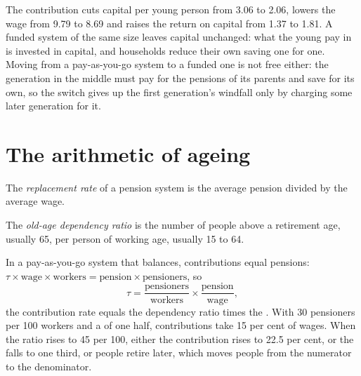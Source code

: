 \label{out:b2:overlapping-generations:olg}

The contribution cuts capital per young person from 3.06 to 2.06, lowers the wage from 9.79 to 8.69 and raises the return on capital from 1.37 to 1.81. A funded system of the same size leaves
capital unchanged: what the young pay in is invested in capital, and households reduce their own saving one for one.
Moving from a pay-as-you-go system to a funded one is not free either: the generation in the middle must pay for the
pensions of its parents and save for its own, so the switch gives up the first generation's windfall only by charging
some later generation for it.

\section{The arithmetic of ageing}\label{sec:b2:overlapping-generations:ageing}

\begin{definition}\label{def:b2:overlapping-generations:replacement-rate}
The \emph{replacement rate} of a pension system is the average pension divided by the average
wage.
\end{definition}

\begin{definition}\label{def:b2:overlapping-generations:oadr}
The \emph{old-age dependency ratio} is the number of people above a retirement age,
usually 65, per person of working age, usually 15 to 64.
\end{definition}

In a pay-as-you-go system that balances, contributions equal pensions: $\tau \times \text{wage} \times \text{workers} = \text{pension} \times \text{pensioners}$, so
\begin{equation}\label{eq:b2:overlapping-generations:payg}
\tau = \frac{\text{pensioners}}{\text{workers}} \times \frac{\text{pension}}{\text{wage}},
\end{equation}
the contribution rate equals the dependency ratio times the . With 30 pensioners per 100 workers and a  of one half, contributions take 15 per cent of wages. When the ratio rises to 45 per 100, either the contribution rises to 22.5 per cent, or the  falls to one third,
or people retire later, which moves people from the numerator to the denominator.

